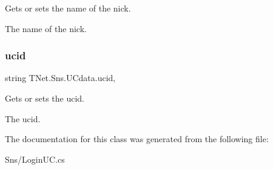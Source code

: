 Gets or sets the name of the nick. 

The name of the nick.\mbox{\label{class_t_net_1_1_sns_1_1_u_cdata_a03c26e0d5706bc4d7f8207dce0263bb7}} 
\subsubsection{\texorpdfstring{ucid}{ucid}}
{\footnotesize\ttfamily string T\+Net.\+Sns.\+U\+Cdata.\+ucid\hspace{0.3cm}{\ttfamily [get]}, {\ttfamily [set]}}



Gets or sets the ucid. 

The ucid.

The documentation for this class was generated from the following file\+:\begin{DoxyCompactItemize}
\item 
Sns/Login\+U\+C.\+cs\end{DoxyCompactItemize}
